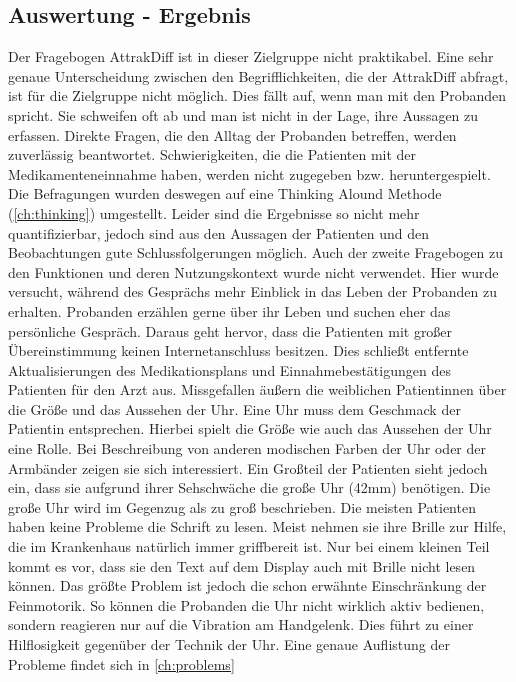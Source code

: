 \subsection{Auswertung - Ergebnis}
Der Fragebogen AttrakDiff ist in dieser Zielgruppe nicht praktikabel. Eine sehr genaue Unterscheidung zwischen den Begrifflichkeiten, die der  AttrakDiff abfragt, ist für die Zielgruppe nicht möglich. Dies fällt auf, wenn man mit den Probanden spricht. Sie schweifen oft ab und man ist nicht in der Lage, ihre Aussagen zu erfassen. Direkte Fragen, die den Alltag der Probanden betreffen, werden zuverlässig beantwortet. Schwierigkeiten, die die Patienten mit der Medikamenteneinnahme haben,  werden nicht zugegeben bzw. heruntergespielt.
Die Befragungen wurden deswegen auf eine Thinking Alound Methode (\ref{ch:thinking}) umgestellt. Leider sind die Ergebnisse so nicht mehr quantifizierbar, jedoch sind aus den Aussagen der Patienten und den Beobachtungen gute Schlussfolgerungen möglich.
Auch der zweite Fragebogen zu den Funktionen und deren Nutzungskontext wurde nicht verwendet. Hier wurde versucht, während des Gesprächs  mehr Einblick in das Leben der Probanden zu erhalten. Probanden erzählen gerne über ihr Leben und suchen eher das persönliche Gespräch. Daraus geht hervor, dass die Patienten mit großer Übereinstimmung keinen Internetanschluss besitzen. Dies schließt entfernte Aktualisierungen des Medikationsplans und Einnahmebestätigungen des Patienten für den Arzt aus. Missgefallen äußern die weiblichen Patientinnen über die Größe und das Aussehen der Uhr. Eine Uhr muss dem Geschmack der Patientin entsprechen. Hierbei spielt die Größe wie auch das Aussehen der Uhr eine Rolle. Bei Beschreibung von anderen modischen Farben der Uhr oder der Armbänder zeigen sie sich interessiert. Ein Großteil der Patienten sieht jedoch ein, dass sie aufgrund ihrer Sehschwäche die große Uhr (42mm) benötigen. Die große Uhr wird im Gegenzug als zu groß beschrieben. Die meisten Patienten haben keine Probleme die Schrift zu lesen. Meist nehmen sie ihre Brille zur Hilfe, die im Krankenhaus natürlich immer griffbereit ist. Nur bei einem kleinen Teil kommt es vor, dass sie den Text auf dem Display auch mit Brille nicht lesen können. Das größte Problem ist jedoch die schon erwähnte Einschränkung der Feinmotorik. So können die Probanden die Uhr nicht wirklich aktiv bedienen, sondern reagieren nur auf die Vibration am Handgelenk. Dies führt zu einer Hilflosigkeit gegenüber der Technik der Uhr. Eine genaue Auflistung der Probleme findet sich in \ref{ch:problems}
